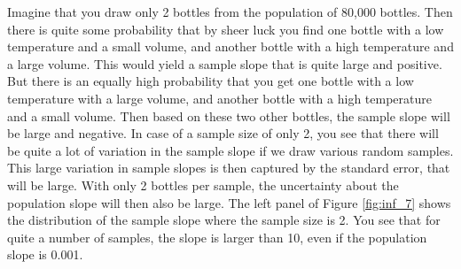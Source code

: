 \documentclass[]{book}\usepackage[]{graphicx}\usepackage[]{color}
\begin{document}


Imagine that you draw only 2 bottles from the population of 80,000 bottles. Then there is quite some probability that by sheer luck you find one bottle with a low temperature and a small volume, and another bottle with a high temperature and a large volume. This would yield a sample slope that is quite large and positive. But there is an equally high probability that you get one bottle with a low temperature with a large volume, and another bottle with a high temperature and a small volume. Then based on these two other bottles, the sample slope will be large and negative. In case of a sample size of only 2, you see that there will be quite a lot of variation in the sample slope if we draw various random samples. This large variation in sample slopes is then captured by the standard error, that will be large. With only 2 bottles per sample, the uncertainty about the population slope will then also be large. The left panel of Figure \ref{fig:inf_7} shows the distribution of the sample slope where the sample size is 2. You see that for quite a number of samples, the slope is larger than 10, even if the population slope is 0.001.
\end{document}
